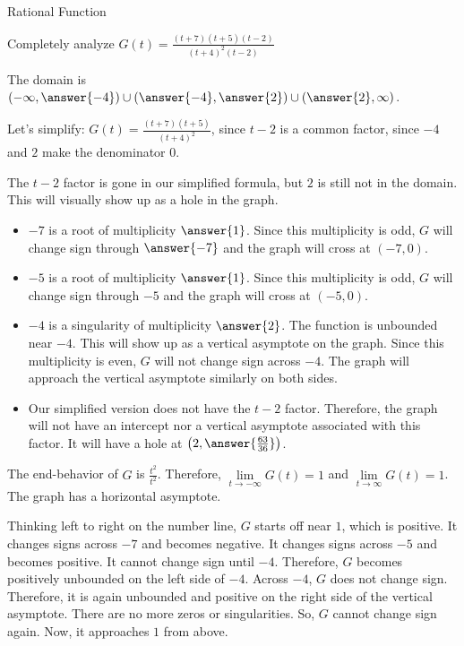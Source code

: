 \documentclass{ximera}
\begin{document}
\begin{example} Rational Function


Completely analyze $G(t) = \frac{(t+7)(t+5)(t-2)}{(t+4)^2(t-2)}$




\begin{explanation}



The domain is $\left( -\infty, \answer{-4} \right) \cup \left(\answer{-4}, \answer{2} \right) \cup \left( \answer{2}, \infty \right)$.

Let's simplify: $G(t) = \frac{(t+7)(t+5)}{(t+4)^2}$, since $t-2$ is a common factor, since $-4$ and $2$ make the denominator $0$.



The $t-2$ factor is gone in our simplified formula, but $2$ is still not in the domain.  This will visually show up as a hole in the graph.



\begin{itemize}
\item $-7$ is a root of multiplicity $\answer{1}$.  Since this multiplicity is odd, $G$ will change sign through $\answer{-7}$ and the graph will cross at $(-7,0)$.
\item $-5$ is a root of multiplicity $\answer{1}$.  Since this multiplicity is odd, $G$ will change sign through $-5$ and the graph will cross at $(-5,0)$.
\item $-4$ is a singularity of multiplicity $\answer{2}$.  The function is unbounded near $-4$.  This will show up as a vertical asymptote on the graph. Since this multiplicity is even, $G$ will not change sign across $-4$.  The graph will approach the vertical asymptote similarly on both sides.
\item Our simplified version does not have the $t-2$ factor.  Therefore, the graph will not have an intercept nor a vertical asymptote associated with this factor.  It will have a hole at $\left( 2, \answer{\frac{63}{36}} \right)$.
\end{itemize}


The end-behavior of $G$ is $\frac{t^2}{t^2}$.  Therefore, $\lim\limits_{t \to -\infty}G(t) = 1$ and $\lim\limits_{t \to \infty}G(t) = 1$.  The graph has a horizontal asymptote.




Thinking left to right on the number line, $G$ starts off near $1$, which is positive.  It changes signs across $-7$ and becomes negative. It changes signs across $-5$ and becomes positive.  It cannot change sign until $-4$.  Therefore, $G$ becomes positively unbounded on the left side of $-4$.  Across $-4$, $G$ does not change sign.  Therefore, it is again unbounded and positive on the right side of the vertical asymptote.  There are no more zeros or singularities.  So, $G$ cannot change sign again.  Now, it approaches $1$ from above.





\end{explanation}
\end{example}
\end{document}
